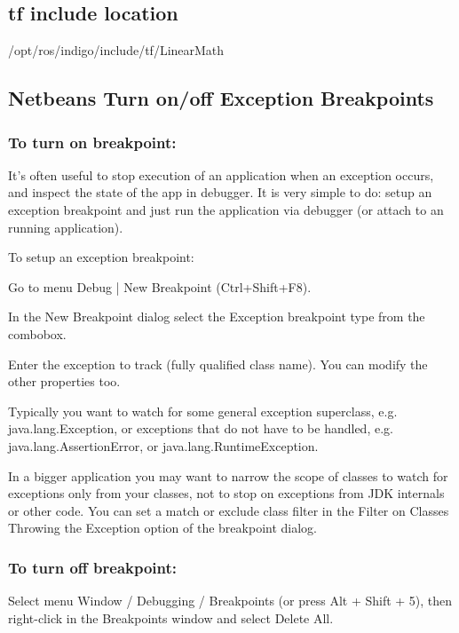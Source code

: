 \subsection*{tf include location }

/opt/ros/indigo/include/tf/\-Linear\-Math

\subsection*{Netbeans Turn on/off Exception Breakpoints }

\subsubsection*{To turn on breakpoint\-:}

It's often useful to stop execution of an application when an exception occurs, and inspect the state of the app in debugger. It is very simple to do\-: setup an exception breakpoint and just run the application via debugger (or attach to an running application).

To setup an exception breakpoint\-: \begin{DoxyVerb}Go to menu Debug | New Breakpoint (Ctrl+Shift+F8).
\end{DoxyVerb}


In the New Breakpoint dialog select the Exception breakpoint type from the combobox.

Enter the exception to track (fully qualified class name). You can modify the other properties too.

Typically you want to watch for some general exception superclass, e.\-g. java.\-lang.\-Exception, or exceptions that do not have to be handled, e.\-g. java.\-lang.\-Assertion\-Error, or java.\-lang.\-Runtime\-Exception.

In a bigger application you may want to narrow the scope of classes to watch for exceptions only from your classes, not to stop on exceptions from J\-D\-K internals or other code. You can set a match or exclude class filter in the Filter on Classes Throwing the Exception option of the breakpoint dialog.

\subsubsection*{To turn off breakpoint\-:}

Select menu Window / Debugging / Breakpoints (or press Alt + Shift + 5), then right-\/click in the Breakpoints window and select Delete All. 